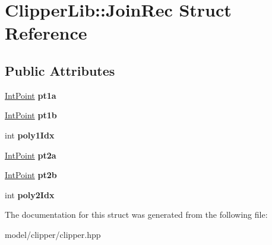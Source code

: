 \hypertarget{structClipperLib_1_1JoinRec}{\section{Clipper\-Lib\-:\-:Join\-Rec Struct Reference}
\label{structClipperLib_1_1JoinRec}
}
\subsection*{Public Attributes}
\begin{DoxyCompactItemize}
\item 
\hypertarget{structClipperLib_1_1JoinRec_a6104df321499a54dae6886f4c9e1f081}{\hyperlink{structClipperLib_1_1IntPoint}{Int\-Point} {\bfseries pt1a}}\label{structClipperLib_1_1JoinRec_a6104df321499a54dae6886f4c9e1f081}

\item 
\hypertarget{structClipperLib_1_1JoinRec_a4f2b81b4c5b3d7a318b336ae5a79bfbe}{\hyperlink{structClipperLib_1_1IntPoint}{Int\-Point} {\bfseries pt1b}}\label{structClipperLib_1_1JoinRec_a4f2b81b4c5b3d7a318b336ae5a79bfbe}

\item 
\hypertarget{structClipperLib_1_1JoinRec_a0182940405f04806ea1e946bf89deebf}{int {\bfseries poly1\-Idx}}\label{structClipperLib_1_1JoinRec_a0182940405f04806ea1e946bf89deebf}

\item 
\hypertarget{structClipperLib_1_1JoinRec_aed147cfa6dda75afeb0545ff8a58e28a}{\hyperlink{structClipperLib_1_1IntPoint}{Int\-Point} {\bfseries pt2a}}\label{structClipperLib_1_1JoinRec_aed147cfa6dda75afeb0545ff8a58e28a}

\item 
\hypertarget{structClipperLib_1_1JoinRec_a97e2949cf90e737e96e93fde982421d0}{\hyperlink{structClipperLib_1_1IntPoint}{Int\-Point} {\bfseries pt2b}}\label{structClipperLib_1_1JoinRec_a97e2949cf90e737e96e93fde982421d0}

\item 
\hypertarget{structClipperLib_1_1JoinRec_a0ee034c5ff30c40182e8bd399df38a7f}{int {\bfseries poly2\-Idx}}\label{structClipperLib_1_1JoinRec_a0ee034c5ff30c40182e8bd399df38a7f}

\end{DoxyCompactItemize}


The documentation for this struct was generated from the following file\-:\begin{DoxyCompactItemize}
\item 
model/clipper/clipper.\-hpp\end{DoxyCompactItemize}
